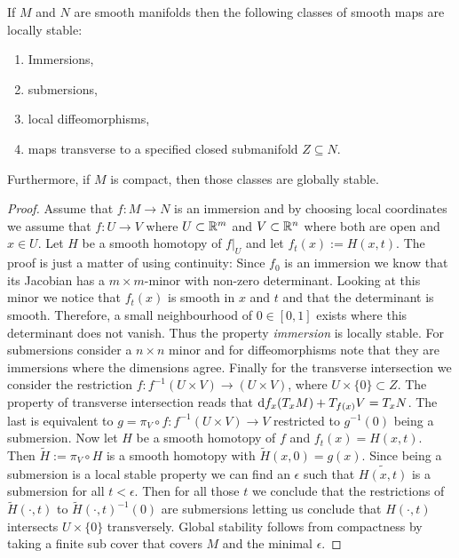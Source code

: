 \begin{theorem}
If $M$ and $N$ are smooth manifolds then the following classes of smooth maps are locally stable:
\begin{enumerate}
\item Immersions,
\item submersions,
\item local diffeomorphisms,
\item maps transverse to a specified closed submanifold $Z\subseteq N$. 
\end{enumerate}
Furthermore, if $M$ is compact, then those classes are globally stable. 
\end{theorem}
\begin{proof}
Assume that $f:M\to N$ is an immersion and by choosing local coordinates we assume that $f:U \to V$ where $U\subset \mathbb{R}^m$ and $V\subset \mathbb{R}^n$ where both are open and $x\in U$. Let $H$ be a smooth homotopy of $f|_U$ and let $f_t(x):= H(x,t)$. The proof is just a matter of using continuity: Since $f_0$ is an immersion we know that its Jacobian has a $m\times m$-minor with non-zero determinant. Looking at this minor we notice that $f_t(x)$ is smooth in $x$ and $t$ and that the determinant is smooth. Therefore, a small neighbourhood of $0\in [0,1]$ exists where this determinant does not vanish. Thus the property \textit{immersion} is locally stable. For submersions consider a $n \times n$ minor and for diffeomorphisms note that they are immersions where the dimensions agree. Finally for the transverse intersection we consider the restriction  ${f:f^{-1}(U \times V)\to (U\times V)}$, where ${U\times \{0\} \subset Z}$. The property of transverse intersection reads that ${\mathop{}\!\mathrm{d} f_x(T_xM)+T_{f(x)}V=T_xN}$. The last is equivalent to ${g=\pi_V\circ f:f^{-1}(U \times V)\to V }$ restricted to $g^{-1}(0)$ being a submersion. Now let $H$ be a smooth homotopy of $f$ and $f_t(x)=H(x,t)$. Then $\tilde{H}:= \pi_V\circ H$ is a smooth homotopy with $\tilde{H}(x,0)=g(x)$. Since being a submersion is a local stable property we can find an $\epsilon$ such that $\tilde{H(x,t)}$ is a submersion for all $t<\epsilon$. Then for all those $t$ we conclude that the restrictions of $\tilde{H}(\cdot ,t)$ to $\tilde{H}(\cdot,t)^{-1}(0)$ are submersions letting us conclude that $H(\cdot,t)$  intersects $U\times \{0\}$ transversely. Global stability follows from compactness by taking a finite sub cover that covers $M$ and the minimal $\epsilon$. 
\end{proof}







